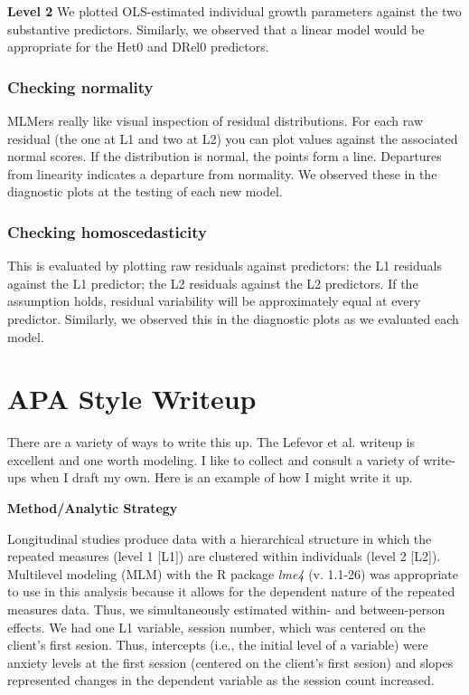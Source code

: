 \documentclass[
  english,
]{book}
\begin{document}
\textbf{Level 2} We plotted OLS-estimated individual growth parameters against the two substantive predictors. Similarly, we observed that a linear model would be appropriate for the Het0 and DRel0 predictors.

\hypertarget{checking-normality}{%
\subsubsection{Checking normality}\label{checking-normality}}

MLMers really like visual inspection of residual distributions. For each raw residual (the one at L1 and two at L2) you can plot values against the associated normal scores. If the distribution is normal, the points form a line. Departures from linearity indicates a departure from normality. We observed these in the diagnostic plots at the testing of each new model.

\hypertarget{checking-homoscedasticity}{%
\subsubsection{Checking homoscedasticity}\label{checking-homoscedasticity}}

This is evaluated by plotting raw residuals against predictors: the L1 residuals against the L1 predictor; the L2 residuals against the L2 predictors. If the assumption holds, residual variability will be approximately equal at every predictor. Similarly, we observed this in the diagnostic plots as we evaluated each model.

\hypertarget{apa-style-writeup-2}{%
\section{APA Style Writeup}\label{apa-style-writeup-2}}

There are a variety of ways to write this up. The Lefevor et al. \citeyearpar{lefevor_religious_2017} writeup is excellent and one worth modeling. I like to collect and consult a variety of write-ups when I draft my own. Here is an example of how I might write it up.

\textbf{Method/Analytic Strategy}

Longitudinal studies produce data with a hierarchical structure in which the repeated measures (level 1 {[}L1{]}) are clustered within individuals (level 2 {[}L2{]}). Multilevel modeling (MLM) with the R package \emph{lme4} (v. 1.1-26) was appropriate to use in this analysis because it allows for the dependent nature of the repeated measures data. Thus, we simultaneously estimated within- and between-person effects. We had one L1 variable, session number, which was centered on the client's first sesion. Thus, intercepts (i.e., the initial level of a variable) were anxiety levels at the first session (centered on the client's first sesion) and slopes represented changes in the dependent variable as the session count increased.
\end{document}
